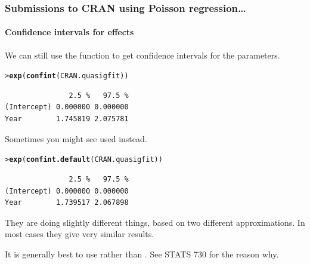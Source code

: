 \documentclass{beamer}\usepackage[]{graphicx}\usepackage[]{xcolor}
\makeatletter
\newcommand{\hlstd}[1]{\textcolor[rgb]{0.345,0.345,0.345}{#1}}%
\newcommand{\hlkwd}[1]{\textcolor[rgb]{0.737,0.353,0.396}{\textbf{#1}}}%
\newenvironment{kframe}{%
 \def\at@end@of@kframe{}%
 \ifinner\ifhmode%
  \def\at@end@of@kframe{\end{minipage}}%
  \begin{minipage}{\columnwidth}%
 \fi\fi%
 \def\FrameCommand##1{\hskip\@totalleftmargin \hskip-\fboxsep
 \colorbox{shadecolor}{##1}\hskip-\fboxsep
     \hskip-\linewidth \hskip-\@totalleftmargin \hskip\columnwidth}%
 \MakeFramed {\advance\hsize-\width
   \@totalleftmargin\z@ \linewidth\hsize
   \@setminipage}}%
 {\par\unskip\endMakeFramed%
 \at@end@of@kframe}
\newenvironment{knitrout}{}{} %
\makeatother
\begin{document}
\begin{frame}[fragile]
\frametitle{Submissions to CRAN using Poisson regression\ldots}
\framesubtitle{Confidence intervals for effects}

We can still use the function  to get confidence intervals for the parameters.  
\medskip

\begin{knitrout}\scriptsize
{}\color{fgcolor}\begin{kframe}
\begin{alltt}
\hlstd{> }\hlkwd{exp}\hlstd{(}\hlkwd{confint}\hlstd{(CRAN.quasigfit))}
\end{alltt}


{\ttfamily\noindent\itshape\color{messagecolor}{Waiting for profiling to be done...}}\begin{verbatim}
               2.5 %   97.5 %
(Intercept) 0.000000 0.000000
Year        1.745819 2.075781
\end{verbatim}
\end{kframe}
\end{knitrout}

\bigskip

Sometimes you might see  used instead.

\begin{knitrout}\scriptsize
{}\color{fgcolor}\begin{kframe}
\begin{alltt}
\hlstd{> }\hlkwd{exp}\hlstd{(}\hlkwd{confint.default}\hlstd{(CRAN.quasigfit))}
\end{alltt}
\begin{verbatim}
               2.5 %   97.5 %
(Intercept) 0.000000 0.000000
Year        1.739517 2.067898
\end{verbatim}
\end{kframe}
\end{knitrout}

They are doing slightly different things, based on two different approximations. In most cases they give very similar results.
\bigskip

It is generally best to use  rather than . See STATS 730 for the reason why.

\end{frame}
\end{document}
